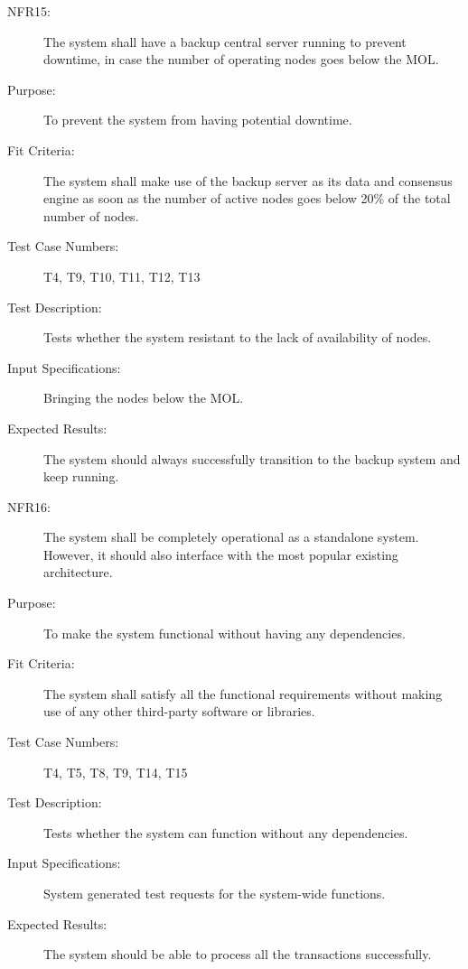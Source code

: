 \documentclass[a4paper,twoside,phd]{BYUPhys}
\begin{document}
\begin{description}
\item[NFR15:] The system shall have a backup central server running to prevent downtime, in case the number of operating nodes goes below the MOL.
\item[Purpose:] To prevent the system from having potential downtime.
\item[Fit Criteria:] The system shall make use of the backup server as its data and consensus engine as soon as the number of active nodes goes below 20\% of the total number of nodes.
\item[Test Case Numbers:] T4, T9, T10, T11, T12, T13
\item[Test Description:] Tests whether the system resistant to the lack of availability of nodes.
\item[Input Specifications:] Bringing the nodes below the MOL.
\item[Expected Results:] The system should always successfully transition to the backup system and keep running.

\item[NFR16:] The system shall be completely operational as a standalone system.  However, it should also interface with the most popular existing architecture.
\item[Purpose:] To make the system functional without having any dependencies.
\item[Fit Criteria:] The system shall satisfy all the functional requirements without making use of any other third-party software or libraries.
\item[Test Case Numbers:] T4, T5, T8, T9, T14, T15
\item[Test Description:] Tests whether the system can function without any dependencies.
\item[Input Specifications:] System generated test requests for the system-wide functions.
\item[Expected Results:] The system should be able to process all the transactions successfully.
\end{description}
\end{document}
